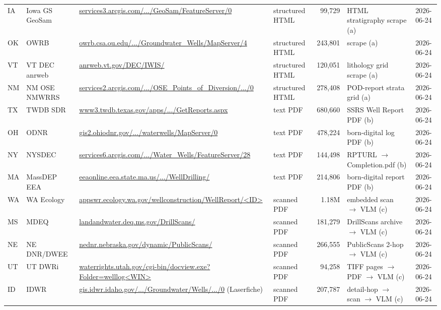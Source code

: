 \documentclass[12pt]{article}
\begin{document}
\begin{longtable}{L{0.05\textwidth} L{0.16\textwidth} L{0.26\textwidth} L{0.10\textwidth} r L{0.10\textwidth} c}
IA & Iowa GS GeoSam \citep{data_ia_geosam} & \url{services3.arcgis.com/.../GeoSam/FeatureServer/0} & structured HTML & 99{,}729 & HTML stratigraphy scrape (a) & 2026-06-24 \\
OK & OWRB \citep{data_ok_owrb} & \url{owrb.csa.ou.edu/.../Groundwater_Wells/MapServer/4} & structured HTML & 243{,}801 &  scrape (a) & 2026-06-24 \\
VT & VT DEC anrweb \citep{data_vt_anr} & \url{anrweb.vt.gov/DEC/IWIS/} & structured HTML & 120{,}051 & lithology grid scrape (a) & 2026-06-24 \\
NM & NM OSE NMWRRS \citep{data_nm_ose} & \url{services2.arcgis.com/.../OSE_Points_of_Diversion/.../0} & structured HTML & 278{,}408 & POD-report strata grid (a) & 2026-06-24 \\
TX & TWDB SDR \citep{data_tx_twdb} & \url{www3.twdb.texas.gov/apps/.../GetReports.aspx} & text PDF & 680{,}660 & SSRS Well Report PDF (b) & 2026-06-24 \\
OH & ODNR \citep{data_oh_odnr} & \url{gis2.ohiodnr.gov/.../waterwells/MapServer/0} & text PDF & 478{,}224 & born-digital log PDF (b) & 2026-06-24 \\
NY & NYSDEC \citep{data_ny_dec} & \url{services6.arcgis.com/.../Water_Wells/FeatureServer/28} & text PDF & 144{,}498 & RPTURL $\to$ Completion.pdf (b) & 2026-06-24 \\
MA & MassDEP EEA \citep{data_ma_massdep} & \url{eeaonline.eea.state.ma.us/.../WellDrilling/} & text PDF & 214{,}806 & born-digital report PDF (b) & 2026-06-24 \\
WA & WA Ecology \citep{data_wa_ecology} & \url{appswr.ecology.wa.gov/wellconstruction/WellReport/<ID>} & scanned PDF & 1.18M & embedded scan $\to$ VLM (c) & 2026-06-24 \\
MS & MDEQ \citep{data_ms_mdeq} & \url{landandwater.deq.ms.gov/DrillScans/} & scanned PDF & 181{,}279 & DrillScans archive $\to$ VLM (c) & 2026-06-24 \\
NE & NE DNR/DWEE \citep{data_ne_dnr} & \url{nednr.nebraska.gov/dynamic/PublicScans/} & scanned PDF & 266{,}555 & PublicScans 2-hop $\to$ VLM (c) & 2026-06-24 \\
UT & UT DWRi \citep{data_ut_dwri} & \url{waterrights.utah.gov/cgi-bin/docview.exe?Folder=welllog<WIN>} & scanned PDF & 94{,}258 & TIFF pages $\to$ PDF $\to$ VLM (c) & 2026-06-24 \\
ID & IDWR \citep{data_id_idwr} & \url{gis.idwr.idaho.gov/.../Groundwater/Wells/.../0} (Laserfiche) & scanned PDF & 207{,}787 & detail-hop $\to$ scan $\to$ VLM (c) & 2026-06-24 \\

\end{longtable}
\end{document}
